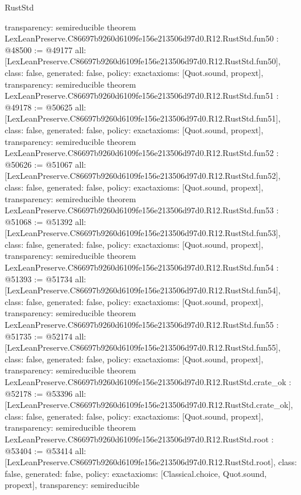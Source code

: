 \begin{lexlean}{RustStd}
\begin{coremodule}
{  transparency: semireducible
}
theorem LexLeanPreserve.C86697b9260d6109fe156e213506d97d0.R12.RustStd.fun50 : @48500 := @49177 {
  all: [LexLeanPreserve.C86697b9260d6109fe156e213506d97d0.R12.RustStd.fun50],
  class: false,
  generated: false,
  policy: exact{axioms: [Quot.sound, propext]},
  transparency: semireducible
}
theorem LexLeanPreserve.C86697b9260d6109fe156e213506d97d0.R12.RustStd.fun51 : @49178 := @50625 {
  all: [LexLeanPreserve.C86697b9260d6109fe156e213506d97d0.R12.RustStd.fun51],
  class: false,
  generated: false,
  policy: exact{axioms: [Quot.sound, propext]},
  transparency: semireducible
}
theorem LexLeanPreserve.C86697b9260d6109fe156e213506d97d0.R12.RustStd.fun52 : @50626 := @51067 {
  all: [LexLeanPreserve.C86697b9260d6109fe156e213506d97d0.R12.RustStd.fun52],
  class: false,
  generated: false,
  policy: exact{axioms: [Quot.sound, propext]},
  transparency: semireducible
}
theorem LexLeanPreserve.C86697b9260d6109fe156e213506d97d0.R12.RustStd.fun53 : @51068 := @51392 {
  all: [LexLeanPreserve.C86697b9260d6109fe156e213506d97d0.R12.RustStd.fun53],
  class: false,
  generated: false,
  policy: exact{axioms: [Quot.sound, propext]},
  transparency: semireducible
}
theorem LexLeanPreserve.C86697b9260d6109fe156e213506d97d0.R12.RustStd.fun54 : @51393 := @51734 {
  all: [LexLeanPreserve.C86697b9260d6109fe156e213506d97d0.R12.RustStd.fun54],
  class: false,
  generated: false,
  policy: exact{axioms: [Quot.sound, propext]},
  transparency: semireducible
}
theorem LexLeanPreserve.C86697b9260d6109fe156e213506d97d0.R12.RustStd.fun55 : @51735 := @52174 {
  all: [LexLeanPreserve.C86697b9260d6109fe156e213506d97d0.R12.RustStd.fun55],
  class: false,
  generated: false,
  policy: exact{axioms: [Quot.sound, propext]},
  transparency: semireducible
}
theorem LexLeanPreserve.C86697b9260d6109fe156e213506d97d0.R12.RustStd.crate_ok : @52178 := @53396 {
  all: [LexLeanPreserve.C86697b9260d6109fe156e213506d97d0.R12.RustStd.crate_ok],
  class: false,
  generated: false,
  policy: exact{axioms: [Quot.sound, propext]},
  transparency: semireducible
}
theorem LexLeanPreserve.C86697b9260d6109fe156e213506d97d0.R12.RustStd.root : @53404 := @53414 {
  all: [LexLeanPreserve.C86697b9260d6109fe156e213506d97d0.R12.RustStd.root],
  class: false,
  generated: false,
  policy: exact{axioms: [Classical.choice, Quot.sound, propext]},
  transparency: semireducible
}


\end{coremodule}
\end{lexlean}
